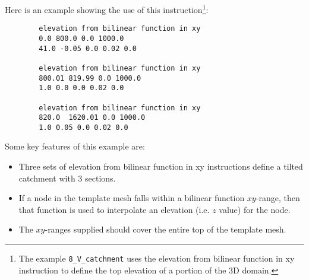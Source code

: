 Here is an example showing the use of this instruction\footnote{The example \texttt{8\_V\_catchment} uses the \textsf{elevation from bilinear function in xy} instruction to define the top elevation of a portion of the 3D domain.}:
    \begin{verbatim}
        elevation from bilinear function in xy
        0.0 800.0 0.0 1000.0
        41.0 -0.05 0.0 0.02 0.0

        elevation from bilinear function in xy
        800.01 819.99 0.0 1000.0
        1.0 0.0 0.0 0.02 0.0

        elevation from bilinear function in xy
        820.0  1620.01 0.0 1000.0
        1.0 0.05 0.0 0.02 0.0
     \end{verbatim}
     \squish
Some key features of this example are:
\begin{itemize}
  \item Three sets of \textsf{elevation from bilinear function in xy} instructions define a tilted catchment with 3 sections.
  \item If a node in the template mesh falls within a bilinear function $xy$-range, then that function is used to interpolate an elevation (i.e. $z$ value) for the node.
  \item The $xy$-ranges supplied should cover the entire top of the template mesh.
\end{itemize}


\pagebreak
